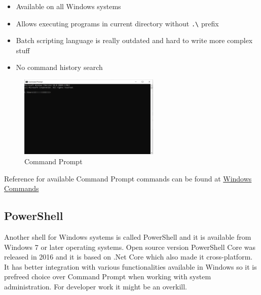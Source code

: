 \documentclass[lang=en,color=green]{elegantbook}
\begin{document}
\noindent\begin{minipage}[t]{0.5\textwidth}%
    \begin{itemize}[leftmargin=*]
        \item Available on all Windows systems
        \item Allows executing programs in current directory without  \lstinline{.\}  prefix
    \end{itemize}
\end{minipage}%
\begin{minipage}[t]{0.5\textwidth}%
    \begin{itemize}[leftmargin=*]
        \item Batch scripting language is really outdated and hard to write more complex stuff
        \item No command history search
    \end{itemize}
\end{minipage}%

\begin{figure}[htbp]
    \centering
    \includegraphics[width=0.6\textwidth]{images/command-prompt.png}
    \caption{Command Prompt\label{fig:Command Prompt}}
\end{figure}

Reference for available Command Prompt commands can be found at \href{https://docs.microsoft.com/en-us/windows-server/administration/windows-commands/windows-commands}{Windows Commands}

\subsection{PowerShell} 
Another shell for Windows systems is called PowerShell and it is available from
Windows 7 or later operating systems. Open source version PowerShell Core was released in 2016 and  
it is based on .Net Core which also made it cross-platform. It has better integration
with various functionalities available in Windows so it is prefreed choice over Command Prompt
when working with system administration. For developer work it might be an overkill.
\end{document}
